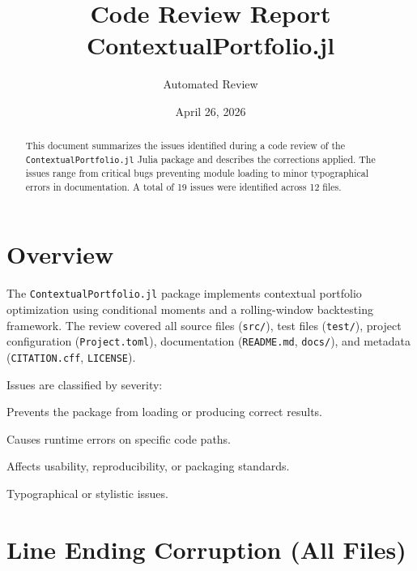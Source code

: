 \documentclass[11pt,a4paper]{article}
\title{\textbf{Code Review Report}\\[0.3em]
\large ContextualPortfolio.jl}
\author{Automated Review}
\date{April 26, 2026}
\begin{document}
\maketitle

\begin{abstract}
This document summarizes the issues identified during a code review of the
\texttt{ContextualPortfolio.jl} Julia package and describes the corrections applied.
The issues range from critical bugs preventing module loading to minor typographical
errors in documentation. A total of 19 issues were identified across 12 files.
\end{abstract}

\tableofcontents
\newpage

\section{Overview}

The \texttt{ContextualPortfolio.jl} package implements contextual portfolio
optimization using conditional moments and a rolling-window backtesting framework.
The review covered all source files (\texttt{src/}), test files (\texttt{test/}),
project configuration (\texttt{Project.toml}), documentation (\texttt{README.md},
\texttt{docs/}), and metadata (\texttt{CITATION.cff}, \texttt{LICENSE}).

Issues are classified by severity:
\begin{description}[style=nextline]
  \item[Critical] Prevents the package from loading or producing correct results.
  \item[Bug] Causes runtime errors on specific code paths.
  \item[Important] Affects usability, reproducibility, or packaging standards.
  \item[Minor] Typographical or stylistic issues.
\end{description}

\section{Line Ending Corruption (All Files)}
\label{sec:crlf}
\end{document}
